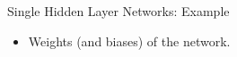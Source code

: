 \documentclass[11pt,compress,t,notes=noshow]{beamer}
\begin{document}
\begin{frame} {Single Hidden Layer Networks: Example}
  \begin{itemize}
    \item Weights (and biases) of the network.
  \begin{figure}
    \centering

\end{figure}
\end{itemize}
\end{frame}
\end{document}
